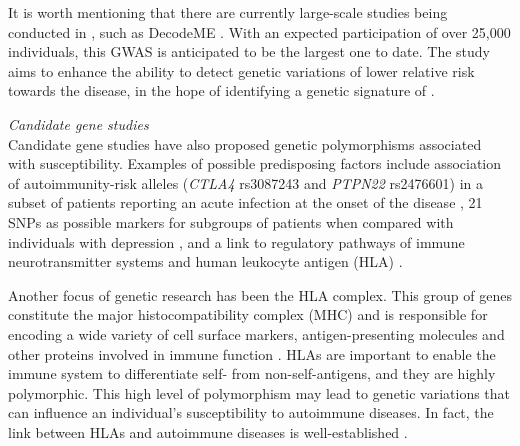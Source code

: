 It is worth mentioning that there are currently large-scale studies being conducted in \cfs, such as DecodeME \citep{devereux-cooke2022DecodeMECommunity}.
With an expected participation of over 25,000 individuals, this GWAS is anticipated to be the largest one to date.
The study aims to enhance the ability to detect genetic variations of lower relative risk towards the disease, in the hope of identifying a genetic signature of \cfs \citep{dibble2020GeneticRisk}.


\bsni
\textit{Candidate gene studies}\\
\noindent
Candidate gene studies have also proposed genetic polymorphisms associated with \cfs susceptibility.
Examples of possible predisposing factors include association of autoimmunity-risk alleles (\textit{CTLA4} rs3087243 and \textit{PTPN22} rs2476601) in a subset of patients reporting an acute infection at the onset of the disease \citep{steiner2020AutoimmunityRelatedRisk}, 
21 SNPs as possible markers for subgroups of patients when compared with individuals with depression \citep{shimosakoUseSinglenucleotidePolymorphisms2014}, and a link to regulatory pathways of immune neurotransmitter systems and human leukocyte antigen (HLA) \citep{wang2017SystematicReview}.

Another focus of genetic research has been the HLA complex.
This group of genes constitute the major histocompatibility complex (MHC) and is responsible for encoding a wide variety of cell surface markers, antigen-presenting molecules and other proteins involved in immune function \citep{janeway2017Immunology}.
HLAs are important to enable the immune system to differentiate self- from non-self-antigens, and they are highly polymorphic.
This high level of polymorphism may lead to genetic variations that can influence an individual's susceptibility to autoimmune diseases.
In fact, the link between HLAs and autoimmune diseases is well-established \citep{trowsdale2013MajorHistocompatibility, cruz-tapias2013HLAAssociation, matzaraki2017MHCLocus}.

